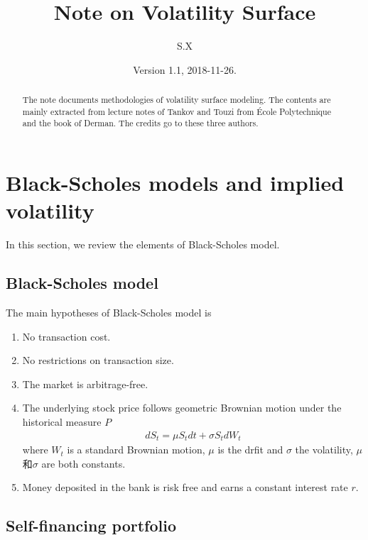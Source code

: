 \documentclass[10pt]{article}
\theoremstyle{plain}
\numberwithin{equation}{section}
\numberwithin{table}{section}
\newcommand{\s}{\sigma}
\begin{document}
\title{Note on Volatility Surface}
\author{S.X}
\date{Version 1.1, 2018-11-26.}

\maketitle

\begin{abstract}
The note documents methodologies of volatility surface modeling. The contents are mainly extracted
from lecture notes of Tankov\cite{Tankov} and Touzi\cite{Touzi} from \'Ecole Polytechnique and the book of Derman\cite{Derman}. 
The credits go to these three authors.
\end{abstract}

\tableofcontents

\newpage

\section{Black-Scholes models and implied volatility}\label{sect_BS}

In this section, we review the elements of Black-Scholes model.

\subsection{Black-Scholes model}

The main hypotheses of Black-Scholes model is 
\begin{enumerate}
    \item No transaction cost.
    \item No restrictions on transaction size.
    \item The market is arbitrage-free.
    \item The underlying stock price follows geometric Brownian motion under the historical measure $P$
    \begin{eqnarray}
          d S_t = \mu S_t dt+\s S_t d W_t
    \label{GBM}
    \end{eqnarray}
    where $W_t$ is a standard Brownian motion, $\mu$ is the drfit and $\s$ the volatility, $\mu$和$\s$ are both constants. 
    \item Money deposited in the bank is risk free and earns a constant interest rate $r$.    
\end{enumerate}

\subsection{Self-financing portfolio}
\end{document}
